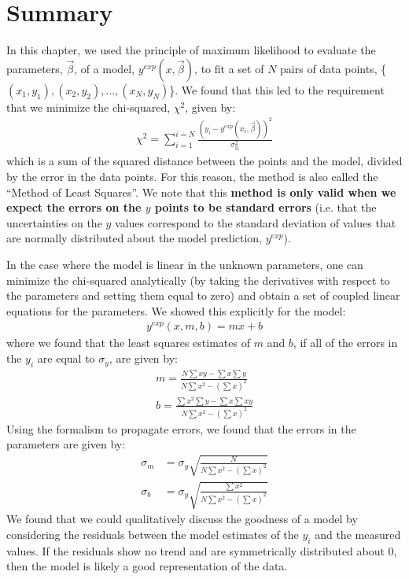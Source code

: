 
\section{Summary}
In this chapter, we used the principle of maximum likelihood to evaluate the parameters, $\vec\beta$, of a model, $y^{exp}(x,\vec\beta)$, to fit a set of $N$ pairs of data points, \{$(x_1,y_1), (x_2,y_2), \dots, (x_N,y_N)$\}. We found that this led to the requirement that we minimize the chi-squared, $\chi^2$, given by:
\begin{align}
\chi^2=\sum_{i=1}^{i=N}\frac{(y_i-y^{exp}(x_i,\vec\beta))^2}{\sigma_{y_i}^2}
\end{align}
which is a sum of the squared distance between the points and the model, divided by the error in the data points. For this reason, the method is also called the ``Method of Least Squares''. We note that this \textbf{method is only valid when we expect the errors on the $y$ points to be standard errors} (i.e. that the uncertainties on the $y$ values correspond to the standard deviation of values that are normally distributed about the model prediction, $y^{exp}$).

In the case where the model is linear in the unknown parameters, one can minimize the chi-squared analytically (by taking the derivatives with respect to the parameters and setting them equal to zero) and obtain a set of coupled linear equations for the parameters. We showed this explicitly for the model:
\begin{align}
y^{exp}(x,m,b)=mx+b
\end{align}
where we found that the least squares estimates of $m$ and $b$, if all of the errors in the $y_i$ are equal to $\sigma_y$, are given by:
\begin{align}
m=\frac{N\sum xy-\sum x\sum y}{N\sum x^2-\left(\sum x\right)^2}\nonumber\\
b=\frac{\sum x^2\sum y-\sum x \sum xy}{N\sum x^2-\left(\sum x\right)^2}
\end{align}
Using the formalism to propagate errors, we found that the errors in the parameters are given by:
\begin{align}
\sigma_m&=\sigma_y\sqrt{\frac{N}{N\sum x^2-\left(\sum x\right)^2}}\nonumber\\
\sigma_b&=\sigma_y\sqrt{\frac{\sum x^2}{N\sum x^2-\left(\sum x\right)^2}}
\end{align}
We found that we could qualitatively discuss the goodness of a model by considering the residuals between the model estimates of the $y_i$ and the measured values. If the residuals show no trend and are symmetrically distributed about 0, then the model is likely a good representation of the data.

